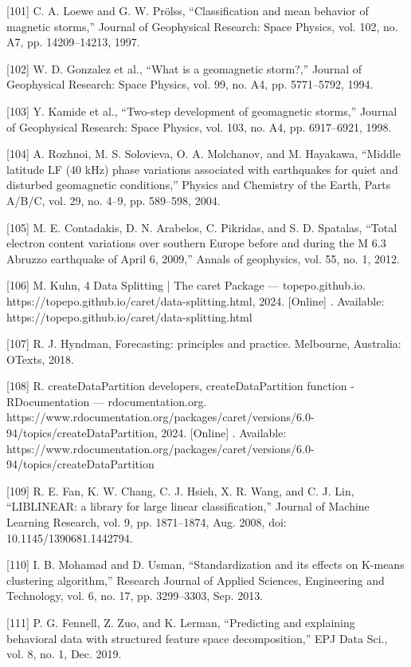\documentclass[sn-mathphys-num]{sn-jnl}%
\begin{document}
[101] C. A. Loewe and G. W. Prölss, “Classification and mean behavior of magnetic storms,” Journal of Geophysical Research: Space Physics, vol. 102, no. A7, pp. 14209–14213, 1997.

[102] W. D. Gonzalez et al., “What is a geomagnetic storm?,” Journal of Geophysical Research: Space Physics, vol. 99, no. A4, pp. 5771–5792, 1994.

[103] Y. Kamide et al., “Two-step development of geomagnetic storms,” Journal of Geophysical Research: Space Physics, vol. 103, no. A4, pp. 6917–6921, 1998.

[104] A. Rozhnoi, M. S. Solovieva, O. A. Molchanov, and M. Hayakawa, “Middle latitude LF (40 kHz) phase variations associated with earthquakes for quiet and disturbed geomagnetic conditions,” Physics and Chemistry of the Earth, Parts A/B/C, vol. 29, no. 4–9, pp. 589–598, 2004.

[105] M. E. Contadakis, D. N. Arabelos, C. Pikridas, and S. D. Spatalas, “Total electron content variations over southern Europe before and during the M 6.3 Abruzzo earthquake of April 6, 2009,” Annals of geophysics, vol. 55, no. 1, 2012.

[106] M. Kuhn, 4 Data Splitting | The caret Package — topepo.github.io. https://topepo.github.io/caret/data-splitting.html, 2024. [Online] . Available: https://topepo.github.io/caret/data-splitting.html

[107] R. J. Hyndman, Forecasting: principles and practice. Melbourne, Australia: OTexts, 2018.

[108] R. createDataPartition developers, createDataPartition function - RDocumentation — rdocumentation.org. https://www.rdocumentation.org/packages/caret/versions/6.0-94/topics/createDataPartition, 2024. [Online] . Available: https://www.rdocumentation.org/packages/caret/versions/6.0-94/topics/createDataPartition

[109] R. E. Fan, K. W. Chang, C. J. Hsieh, X. R. Wang, and C. J. Lin, “LIBLINEAR: a library for large linear classification,” Journal of Machine Learning Research, vol. 9, pp. 1871–1874, Aug. 2008, doi: 10.1145/1390681.1442794.

[110] I. B. Mohamad and D. Usman, “Standardization and its effects on K-means clustering algorithm,” Research Journal of Applied Sciences, Engineering and Technology, vol. 6, no. 17, pp. 3299–3303, Sep. 2013.

[111] P. G. Fennell, Z. Zuo, and K. Lerman, “Predicting and explaining behavioral data with structured feature space decomposition,” EPJ Data Sci., vol. 8, no. 1, Dec. 2019.
\end{document}
